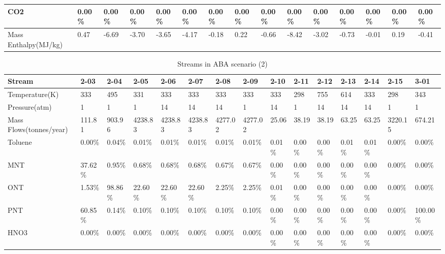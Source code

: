 \begin{landscape}
\begin{table}[H]
\begin{tabular}{|l|l|l|l|l|l|l|l|l|l|l|l|l|l|l|}
CO2                     & 0.00\%  & 0.00\%  & 0.00\%  & 0.00\%  & 0.00\%  & 0.00\%  & 0.00\%  & 0.00\%  & 0.00\%  & 0.00\%  & 0.00\%  & 0.00\%  & 0.00\%  & 0.00\%   \\ \hline
Mass Enthalpy(MJ/kg)    & 0.47    & -6.69   & -3.70   & -3.65   & -4.17   & -0.18   & 0.22    & -0.66   & -8.42   & -3.02   & -0.73   & -0.01   & 0.19    & -0.41    \\ \hline
\end{tabular}
\end{table}


\begin{table}[H]
\centering
\caption{Streams in ABA scenario (2)}
\label{ABAFST2}
\begin{tabular}{|l|l|l|l|l|l|l|l|l|l|l|l|l|l|l|}
\hline
\textbf{Stream}         & 2-03    & 2-04    & 2-05    & 2-06    & 2-07    & 2-08    & 2-09    & 2-10    & 2-11     & 2-12     & 2-13    & 2-14    & 2-15    & 3-01     \\ \hline
Temperature(K)          & 333     & 495     & 331     & 333     & 333     & 333     & 333     & 333     & 298      & 755      & 614     & 333     & 298     & 343      \\ \hline
Pressure(atm)           & 1       & 1       & 1       & 14      & 14      & 14      & 1       & 14      & 1        & 14       & 14      & 14      & 1       & 1        \\ \hline
Mass Flows(tonnes/year) & 111.81  & 903.96  & 4238.83 & 4238.83 & 4238.83 & 4277.02 & 4277.02 & 25.06   & 38.19    & 38.19    & 63.25   & 63.25   & 3220.15 & 674.21   \\ \hline
Toluene                 & 0.00\%  & 0.04\%  & 0.01\%  & 0.01\%  & 0.01\%  & 0.01\%  & 0.01\%  & 0.01\%  & 0.00\%   & 0.00\%   & 0.01\%  & 0.01\%  & 0.00\%  & 0.00\%   \\ \hline
MNT                     & 37.62\% & 0.95\%  & 0.68\%  & 0.68\%  & 0.68\%  & 0.67\%  & 0.67\%  & 0.00\%  & 0.00\%   & 0.00\%   & 0.00\%  & 0.00\%  & 0.00\%  & 0.00\%   \\ \hline
ONT                     & 1.53\%  & 98.86\% & 22.60\% & 22.60\% & 22.60\% & 2.25\%  & 2.25\%  & 0.01\%  & 0.00\%   & 0.00\%   & 0.00\%  & 0.00\%  & 0.00\%  & 0.00\%   \\ \hline
PNT                     & 60.85\% & 0.14\%  & 0.10\%  & 0.10\%  & 0.10\%  & 0.10\%  & 0.10\%  & 0.00\%  & 0.00\%   & 0.00\%   & 0.00\%  & 0.00\%  & 0.00\%  & 100.00\% \\ \hline
HNO3                    & 0.00\%  & 0.00\%  & 0.00\%  & 0.00\%  & 0.00\%  & 0.00\%  & 0.00\%  & 0.00\%  & 0.00\%   & 0.00\%   & 0.00\%  & 0.00\%  & 0.00\%  & 0.00\%   \\ \hline

\end{tabular}
\end{table}
\end{landscape}
